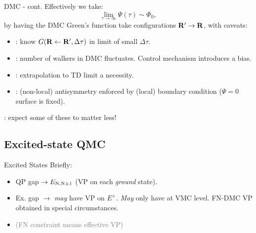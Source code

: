 \documentclass[10pt, pdf, hyperref={draft}, usenames, dvipsnames]{beamer}
\newcommand{\red}[1]{{\bf\color{LancsRed}{#1}}}
\newcommand{\blue}[1]{{\bf\color{NavyBlue}{#1}}}
\newcommand{\green}[1]{{\bf\color{ForestGreen}{#1}}}
\begin{document}
\begin{frame}{DMC - cont.}
  Effectively we take:
  \begin{equation}
  \lim_{\tau \rightarrow \infty} \Psi(\tau) \sim \Phi_{0},
  \end{equation}
  by having the DMC Green's function take configurations ${\bf
  R}'\rightarrow{\bf R}$, with caveats:
  \begin{itemize}
    \item \blue{Time steps}: know $G({\bf R} \leftarrow {\bf
    R'},\Delta\tau)$ in limit of small $\Delta
    \tau$.

    \item \blue{Population control}: number of walkers in DMC
    fluctuates. Control mechanism introduces a bias.

    \item \red{Finite-size (FS) effects}: extrapolation to TD limit
    a necessity.

    \item \red{Fixed-node approximation}: (non-local) antisymmetry enforced by
    (local) boundary condition ($\Psi=0$ surface is fixed).

  \end{itemize}
  \vfill
  \centering
  \green{Gaps}: expect some of these to matter less!
\end{frame}


\subsection{Excited-state QMC}


\begin{frame}{Excited States}
Briefly:
\begin{itemize}
  \item  QP gap $\rightarrow E_{{\rm N}, {\rm N}\pm1}$ (VP on each
  \textit{ground} state).
  \item Ex. gap $\rightarrow$ \textit{may} have VP on $E^{+}$. \textit{May} only
  have at VMC level. FN-DMC VP obtained in special
  circumstances.~
  \item \textcolor{gray}{(FN
  constraint means effective VP)}
\end{itemize}
\end{frame}
\end{document}
